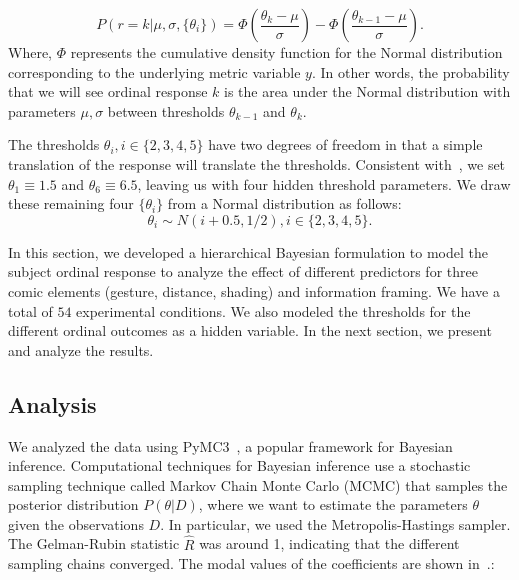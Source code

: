 \begin{equation}
 P(r=k | \mu, \sigma, \{\theta_i\}) = \Phi \left (\frac{\theta_k - \mu}{\sigma} \right) - \Phi \left(\frac{\theta_{k-1} - \mu}{\sigma} \right).
\end{equation}
Where, $\Phi$ represents the cumulative density function for the Normal distribution corresponding to the underlying metric variable $y$. In other words, the probability that we will see ordinal response $k$ is the area under the Normal distribution with parameters $\mu, \sigma$ between thresholds $\theta_{k-1}$ and $\theta_k$.

The thresholds $\theta_i, i \in \{2, 3, 4, 5\}$ have two degrees of freedom in that a simple translation of the response will translate the thresholds. Consistent with~\textcite[][p. 674]{Kruschke2014}, we set $\theta_1\equiv1.5$ and $\theta_6\equiv6.5$, leaving us with four hidden threshold parameters. We draw these remaining four $\{ \theta_i\}$ from a Normal distribution as follows:
\begin{equation}
 \theta_i \sim N(i+0.5, 1/2), i \in \{2, 3, 4, 5\}.
\end{equation}

In this section, we developed a hierarchical Bayesian formulation to model the subject ordinal response to analyze the effect of different predictors for three comic elements (gesture, distance, shading) and information framing. We have a total of $54$ experimental conditions. We also modeled the thresholds for the different ordinal outcomes as a hidden variable. In the next section, we present and analyze the results.

\subsection{Analysis}
\label{sub:Analysis}

We analyzed the data using PyMC3~\cite{Salvatier2016}, a popular framework for Bayesian inference. Computational techniques for Bayesian inference use a stochastic sampling technique called Markov Chain Monte Carlo (MCMC) that samples the posterior distribution $P(\theta | D)$, where we want to estimate the parameters $\theta$ given the observations $D$. In particular, we used the Metropolis-Hastings sampler. The Gelman-Rubin statistic $\hat{R}$ was around 1, indicating that the different sampling chains converged. The modal values of the coefficients are shown in~.:

